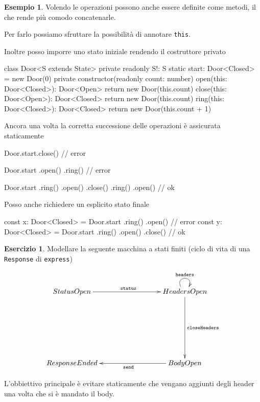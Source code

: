 \documentclass[12pt]{article}
\theoremstyle{definition}
\newtheorem{example}{Esempio}[subsection]
\newtheorem{exercise}{Esercizio}[subsection]
\newenvironment{code}
  {\vspace{0.5cm} \VerbatimEnvironment\begin{typescriptcode}}
  {\end{typescriptcode} \vspace{0.2cm}}
\begin{document}
\begin{example}
Volendo le operazioni possono anche essere definite come metodi, il che rende più comodo concatenarle.

Per farlo possiamo sfruttare la possibilità di annotare \texttt{this}.

Inoltre posso imporre uno stato iniziale rendendo il costruttore privato

\begin{code}
class Door<S extends State> {
  private readonly S!: S
  static start: Door<Closed> = new Door(0)
  private constructor(readonly count: number) {}
  open(this: Door<Closed>): Door<Open> {
    return new Door(this.count)
  }
  close(this: Door<Open>): Door<Closed> {
    return new Door(this.count)
  }
  ring(this: Door<Closed>): Door<Closed> {
    return new Door(this.count + 1)
  }
}
\end{code}

Ancora una volta la corretta successione delle operazioni è assicurata staticamente

\begin{code}
Door.start.close() // error

Door.start
  .open()
  .ring() // error

Door.start
  .ring()
  .open()
  .close()
  .ring()
  .open() // ok
\end{code}

Posso anche richiedere un esplicito stato finale

\begin{code}
const x: Door<Closed> = Door.start
  .ring()
  .open() // error
const y: Door<Closed> = Door.start
  .ring()
  .open()
  .close() // ok
\end{code}
\end{example}

\begin{exercise}
Modellare la seguente macchina a stati finiti (ciclo di vita di una \texttt{Response} di \texttt{express})

\[
\xymatrixrowsep{3cm}
\xymatrixcolsep{3cm}
\xymatrix{
  StatusOpen \ar[r]^{\texttt{status}} & HeadersOpen \ar@(ul,ur)^{\texttt{headers}} \ar[d]^{\texttt{closeHeaders}} \\
  ResponseEnded & BodyOpen \ar[l]^{\texttt{send}} \\
}
\]

L'obbiettivo principale è evitare staticamente che vengano aggiunti degli header una volta che si è mandato il body.
\end{exercise}
\end{document}
